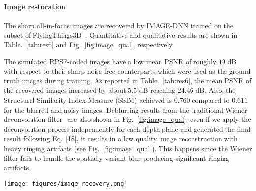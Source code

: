 \documentclass[preprint,5p,twocolumn]{elsarticle}
\begin{document}
\paragraph{Image restoration}
\label{subsec:image_results}


The sharp all-in-focus images are recovered by IMAGE-DNN trained on the subset of FlyingThings3D~\cite{MIFDB16}. Quantitative and qualitative results are shown in Table.~\ref{tab:res6} and Fig.~\ref{fig:image_qual}, respectively. 

The simulated RPSF-coded images have a low mean PSNR of roughly $19$ dB with respect to their sharp noise-free counterparts which were used as the ground truth images during training. As reported in Table.~\ref{tab:res6}, the mean PSNR of the recovered images increased by about $5.5$ dB reaching $24.46$ dB. Also, the Structural Similarity Index Measure (SSIM) achieved is $0.760$ compared  to $0.611$ for the blurred and noisy images. Deblurring results from the traditional Wiener deconvolution filter~\cite{wiener1964extrapolation} are also shown in Fig.~\ref{fig:image_qual}: even if we apply the deconvolution process independently for each depth plane and generated the final result following Eq.~\ref{18}, it results in a low quality image reconstruction with heavy ringing artifacts (see Fig.~\ref{fig:image_qual}).
This happens since the Wiener filter fails to handle the spatially variant blur producing significant ringing artifacts. 

\begin{table}[h!]
\begin{center}
\end{center}
\centering
\caption{Quantitative results of the image deblurring model on the test set of FlyingThings3D~\cite{MIFDB16} subset.}
\label{tab:res6}
\end{table}

\begin{figure*}[h!]
\centering
\texttt{[image: figures/image\_recovery.png]}
\caption{Qualitative results of the image deblurring model on the test set of FlyingThings3D~\cite{MIFDB16} subset.}
\label{fig:image_qual}
\end{figure*}
\end{document}

